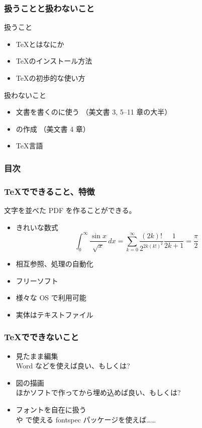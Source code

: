 \documentclass[unicode,12pt,colorlinks,handout]{beamer}
\newcommand{\nishikifont}{\nishikifonta\nishikifontj}
\begin{document}
\begin{frame}
	\frametitle{扱うことと扱わないこと}
	\begin{block}{扱うこと}
		\begin{itemize}
			\item \TeX とはなにか
			\item \TeX のインストール方法
			\item \TeX の初歩的な使い方
		\end{itemize}
	\end{block}
	\begin{block}{扱わないこと}
		\begin{itemize}
		\item 文書を書くのに使う
			{\nishikifont\small （美文書 3, 5--11 章の大半）}
		\item {}の作成
			{\nishikifont\small （美文書 4 章）}
		\item {}\TeX 言語 
		\end{itemize}
	\end{block}
\end{frame}

\begin{frame}
	\frametitle{目次}
	\setlength{\parskip}{0.5ex}
	\tableofcontents
\end{frame}

\frame{\section{\TeX 概観}{\nishikifont 😀 美文書 1 章 😀}}

\begin{frame}
	\frametitle{\protect\TeX でできること、特徴}
	文字を並べた PDF を作ることができる。
	\pause
	\begin{itemize}
		\item きれいな数式
			\[\int_0^\infty \frac{\sin x}{\sqrt{x}}\,dx
			=\sum_{k=0}^\infty \frac{(2k)!}{2^{2k (k!)^2}}\frac{1}{2k+1}=\frac{\pi}{2}\]
		\item 相互参照、処理の自動化
		\item フリーソフト
		\item 様々な OS で利用可能
		\item 実体はテキストファイル
	\end{itemize}
\end{frame}

\begin{frame}
	\frametitle{\TeX でできないこと}
	\begin{itemize}
		\item 見たまま編集\\
			{\footnotesize Word などを使えば良い、もしくは\LyX?}
		\item 図の描画\\
			{\footnotesize ほかソフトで作ってから埋め込めば良い、もしくは\TikZ?}
		\item フォントを自在に扱う\\
			{\footnotesize \LuaTeX や \XeTeX で使える fontspec パッケージを使えば……}
	\end{itemize}
\end{frame}
\end{document}
